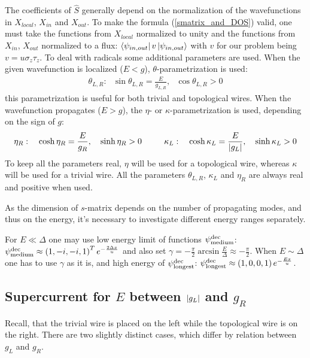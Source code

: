 The coefficients of $ \hat{S} $ generally depend on the normalization of the wavefunctions in $ X_{local} $, $ X_{in}  $ and $ X_{out} $. To make the formula (\ref{smatrix_and_DOS}) valid, one must take the functions from $ X_{local} $ normalized to unity and the functions from $ X_{in}  $, $ X_{out}$ normalized to a flux\cite{Akkermans_Avron_Shapiro_scattering_matrix}: $ \bra{\psi_{in,out}}v \ket{\psi_{in,out}} $ with $ v $ for our problem being $ v=u\sigma_z\tau_z $.
\fi
To deal with radicals some additional parameters are used. When the given wavefunction is localized ($ E<g $), $ \theta $-parametrization is used:
\begin{gather}
\theta_{L,R}:~~~\sin \theta_{L,R} =\frac{E}{g_{L,R}},~~~\cos \theta_{L,R}>0
\end{gather}
this parametrization is useful for both trivial and topological wires. When the wavefunction propagates ($ E>g $), the $ \eta $- or $ \kappa $-parametrization is used, depending on the sign of $ g $:
\begin{gather}
	\eta_R: ~~~\cosh\eta_R = \frac{E}{g_R},~~~\sinh \eta_R >0
	~~~~~~~~
	\kappa_L: ~~~ \cosh\kappa_L= \frac{E}{\left|g_{L}\right|},~~~\sinh \kappa_L>0
\end{gather}
To keep all the parameters real, $ \eta $ will be used for a topological wire, whereas  $ \kappa $ will be used for a trivial wire. All the parameters $ \theta_{L,R}  $,  $\kappa_L $ and $ \eta_R $ are always real and positive when used.

As the dimension of  $ s $-matrix depends on the number of propagating modes, and thus on the energy, it's necessary to investigate different energy ranges separately.

For $ E\ll\Delta $  one may use low energy limit of functions $ \psi_{\mathrm{medium}}^{\mathrm{dec}} $: $ \psi_{\mathrm{medium}}^{\mathrm{dec}} \approx\left(1,-i,-i,1\right)^Te^{-{\frac{2\Delta x}{u}} }$ and also set $ \gamma=-\frac{\pi}{2}\arcsin\frac{E}{\Delta} \approx -\frac{\pi}{2}$. When $ E\sim\Delta $ one has to use $ \gamma $ as it is, and high energy of $ \psi_{\mathrm{longest}}^{\mathrm{dec}} $: $  \psi_{\mathrm{longest}}^{\mathrm{dec}}\approx\left(1,0,0,1\right)e^{-\frac{Ex}{u}}$.

\subsection{ Supercurrent for $ E $ \hspace{0pt} between $ \left|g_L\right| $ and $ g_R $}

Recall, that the trivial wire is placed on the left  while the topological wire is on the right. There are two slightly distinct cases, which differ by relation between $ g_L $ and $ g_R $. 
